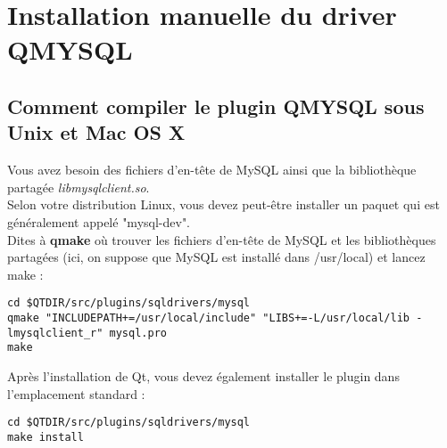 \documentclass[11pt,fleqn]{report}
\begin{document}
\ZMakeCover


\ZMakeTableOfContents


\section{Installation manuelle du driver QMYSQL}
\subsection{Comment compiler le plugin QMYSQL sous Unix et Mac OS X}
Vous avez besoin des fichiers d'en-tête de MySQL ainsi que la bibliothèque partagée \textit{libmysqlclient.so}. \\
Selon votre distribution Linux, vous devez peut-être installer un paquet qui est généralement appelé "mysql-dev".
\\
Dites à \textbf{qmake} où trouver les fichiers d'en-tête de MySQL et les bibliothèques partagées (ici, on suppose que MySQL est installé dans /usr/local) et lancez make :
\begin{lstlisting}
cd $QTDIR/src/plugins/sqldrivers/mysql
qmake "INCLUDEPATH+=/usr/local/include" "LIBS+=-L/usr/local/lib -lmysqlclient_r" mysql.pro
make
\end{lstlisting}

Après l'installation de Qt, vous devez également installer le plugin dans l'emplacement standard :
\begin{lstlisting}
cd $QTDIR/src/plugins/sqldrivers/mysql
make install
\end{lstlisting}
\end{document}
